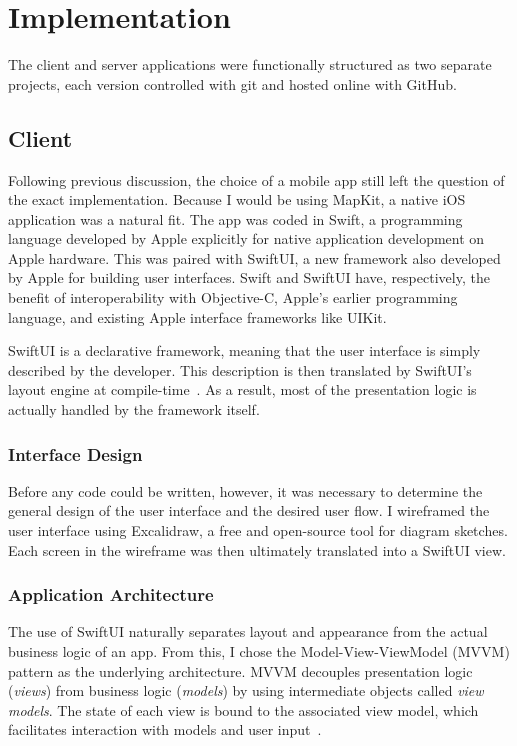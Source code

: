 \section{Implementation}

The client and server applications were functionally structured as two separate projects, each version controlled with \textsf{git} and hosted online with GitHub.  

\subsection{Client}

Following previous discussion, the choice of a mobile app still left the question of the exact implementation. Because I would be using \textsf{MapKit}, a native iOS application was a natural fit. The app was coded in Swift, a programming language developed by Apple explicitly for native application development on Apple hardware. This was paired with \textsf{SwiftUI}, a new framework also developed by Apple for building user interfaces. Swift and \textsf{SwiftUI} have, respectively, the benefit of interoperability with Objective-C, Apple's earlier programming language, and existing Apple interface frameworks like \textsf{UIKit}.

\textsf{SwiftUI} is a declarative framework, meaning that the user interface is simply described by the developer. This description is then translated by \textsf{SwiftUI}'s layout engine at compile-time~\cite{apple_2022}. As a result, most of the presentation logic is actually handled by the framework itself.

\subsubsection{Interface Design}

Before any code could be written, however, it was necessary to determine the general design of the user interface and the desired user flow. I wireframed the user interface using \textsf{Excalidraw}, a free and open-source tool for diagram sketches. Each screen in the wireframe was then ultimately translated into a \textsf{SwiftUI} view.

\subsubsection{Application Architecture}

The use of \textsf{SwiftUI} naturally separates layout and appearance from the actual business logic of an app. From this, I chose the Model-View-ViewModel (\textsc{MVVM}) pattern as the underlying architecture. \textsc{MVVM} decouples presentation logic (\emph{views}) from business logic (\emph{models}) by using intermediate objects called \emph{view models}. The state of each view is bound to the associated view model, which facilitates interaction with models and user input~\cite{britch_2021,hudson_2019}.

